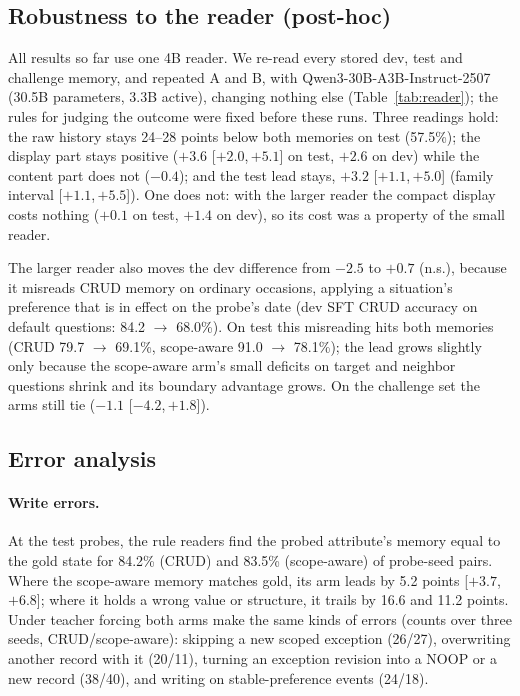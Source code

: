 \documentclass[11pt]{article}
\newcommand{\iv}[2]{[$#1$,\,$#2$]}
\begin{document}
\subsection{Robustness to the reader (post-hoc)}
All results so far use one 4B reader. We re-read every stored dev, test and challenge memory, and repeated A and B, with Qwen3-30B-A3B-Instruct-2507 (30.5B parameters, 3.3B active), changing nothing else (Table~\ref{tab:reader}); the rules for judging the outcome were fixed before these runs. Three readings hold: the raw history stays 24--28 points below both memories on test (57.5\%); the display part stays positive ($+3.6$ \iv{+2.0}{+5.1} on test, $+2.6$ on dev) while the content part does not ($-0.4$); and the test lead stays, $+3.2$ \iv{+1.1}{+5.0} (family interval \iv{+1.1}{+5.5}). One does not: with the larger reader the compact display costs nothing ($+0.1$ on test, $+1.4$ on dev), so its cost was a property of the small reader.

The larger reader also moves the dev difference from $-2.5$ to $+0.7$ (n.s.), because it misreads CRUD memory on ordinary occasions, applying a situation's preference that is in effect on the probe's date (dev SFT CRUD accuracy on default questions: 84.2 $\rightarrow$ 68.0\%). On test this misreading hits both memories (CRUD 79.7 $\rightarrow$ 69.1\%, scope-aware 91.0 $\rightarrow$ 78.1\%); the lead grows slightly only because the scope-aware arm's small deficits on target and neighbor questions shrink and its boundary advantage grows. On the challenge set the arms still tie ($-1.1$ \iv{-4.2}{+1.8}).

\subsection{Error analysis}

\paragraph{Write errors.} At the test probes, the rule readers find the probed attribute's memory equal to the gold state for 84.2\% (CRUD) and 83.5\% (scope-aware) of probe-seed pairs. Where the scope-aware memory matches gold, its arm leads by 5.2 points \iv{+3.7}{+6.8}; where it holds a wrong value or structure, it trails by 16.6 and 11.2 points. Under teacher forcing both arms make the same kinds of errors (counts over three seeds, CRUD/scope-aware): skipping a new scoped exception (26/27), overwriting another record with it (20/11), turning an exception revision into a NOOP or a new record (38/40), and writing on stable-preference events (24/18).
\end{document}
